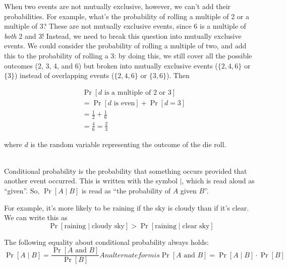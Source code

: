 When two events are not mutually exclusive, however, we can't add 
their probabilities. For example, what's the probability of rolling a 
multiple of 2 or a multiple of 3? These are not mutually exclusive
events, since 6 is a multiple of \emph{both} 2 and 3! Instead, we need 
to break this question into mutually exclusive events. We could consider 
the probability of rolling a multiple of two, and add this to the 
probability of rolling a 3: by doing this, we still cover all the 
possible outcomes (2, 3, 4, and 6) but broken into mutually exclusive 
events ($\{2,4,6\}$ or $\{3\}$) instead of overlapping events ($\{2, 4, 
6\}$ or $\{3, 6\}$). Then

\begin{align*}
    &\Pr[d \text{ is a multiple of 2 or 3}] \\
    &= \Pr[d \text{ is even}] + \Pr[d=3]\\
    &= \frac{1}{2} + \frac{1}{6}\\
    &= \frac{4}{6} = \frac{2}{3}
\end{align*}

where $d$ is the random variable representing the outcome of the die roll.

\hfill\\

Conditional probability is the probability that something occurs 
provided that another event occurred. This is written with the symbol 
$\mid$, which is read aloud as ``given''. So, $\Pr[A \mid B]$ is 
read as ``the probability of $A$ given $B$''.

For example, it's more likely to be raining if the sky is cloudy 
than if it's clear. We can write this as
\[
    \Pr[\text{raining} \mid \text{cloudy sky}] >
    \Pr[\text{raining} \mid \text{clear sky}]
\]

The following equality about conditional probability always holds\footnotemark:
\begin{subequations}\label{eq:conditional}
    \begin{equation}
        \Pr[A \mid B] = \frac{\Pr[A \text{ and } B]}{\Pr[B]}
        \label{eqn:conditional_mid}
    \end{equation}
An alternate form is
    \begin{equation}
        \Pr[A \text{ and } B] = \Pr[A \mid B] \cdot \Pr[B]
        \label{eqn:conditional_and}
    \end{equation}
\end{subequations}

